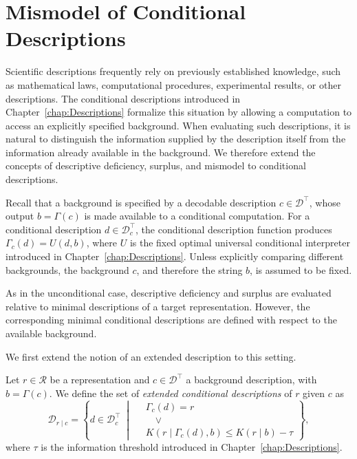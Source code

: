 %
%

\section{Mismodel of Conditional Descriptions}
\label{sec:conditional_mismodel}

Scientific descriptions frequently rely on previously established knowledge, such as mathematical laws, computational procedures, experimental results, or other descriptions. The conditional descriptions introduced in Chapter~\ref{chap:Descriptions} formalize this situation by allowing a computation to access an explicitly specified background. When evaluating such descriptions, it is natural to distinguish the information supplied by the description itself from the information already available in the background. We therefore extend the concepts of descriptive deficiency, surplus, and mismodel to conditional descriptions.

Recall that a background is specified by a decodable description $c\in\mathcal D^\top$, whose output $b=\Gamma(c)$ is made available to a conditional computation. For a conditional description $d\in\mathcal D_c^\top$, the conditional description function produces $\Gamma_c(d)=U(d,b)$, where $U$ is the fixed optimal universal conditional interpreter introduced in Chapter~\ref{chap:Descriptions}. Unless explicitly comparing different backgrounds, the background $c$, and therefore the string $b$, is assumed to be fixed.

As in the unconditional case, descriptive deficiency and surplus are evaluated relative to minimal descriptions of a target representation. However, the corresponding minimal conditional descriptions are defined with respect
to the available background.

We first extend the notion of an extended description to this setting.

\begin{definition}
\label{def:extended_conditional_description}
Let $r\in\mathcal R$ be a representation and $c\in\mathcal D^\top$ a background description, with $b=\Gamma(c)$. We define the set of \emph{extended conditional descriptions} of $r$ given $c$ as
\[
\mathcal D_{r\mid c} = \left\{ d\in\mathcal D_c^\top \;\middle|\; \begin{aligned}
& \Gamma_c(d)=r\\
& \quad\lor\\
& K(r\mid\Gamma_c(d),b) \leq K(r\mid b)-\tau
\end{aligned}
\right\},
\]
where $\tau$ is the information threshold introduced in Chapter~\ref{chap:Descriptions}.
\end{definition}

